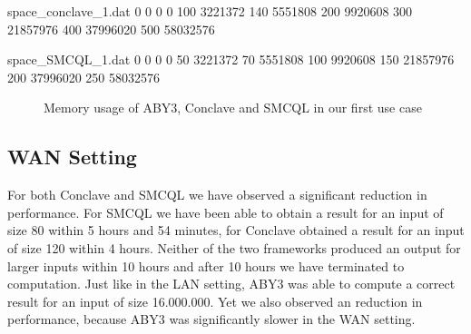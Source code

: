 \begin{filecontents}{space_conclave_1.dat}
	0 0
	0 0
	100 3221372
	140 5551808
	200 9920608
	300 21857976
	400 37996020
	500 58032576
\end{filecontents}
\begin{filecontents}{space_SMCQL_1.dat}
	0 0
	0 0
	50 3221372
	70 5551808
	100 9920608
	150 21857976
	200 37996020
	250 58032576
\end{filecontents}
\begin{figure}[H]
	\caption{Memory usage of ABY3, Conclave and SMCQL in our first use case}
\end{figure}
\subsection{WAN Setting}
For both Conclave and SMCQL we have observed a significant reduction in performance. For SMCQL we have been able to obtain a result for an input of size 80 within 5 hours and 54 minutes, for Conclave obtained a result for an input of size 120 within 4 hours. Neither of the two frameworks produced an output for larger inputs within 10 hours and after 10 hours we have terminated to computation. Just like in the LAN setting, ABY3 was able to compute a correct result for an input of size 16.000.000. Yet we also observed an reduction in performance, because ABY3 was significantly slower in the WAN setting. 


